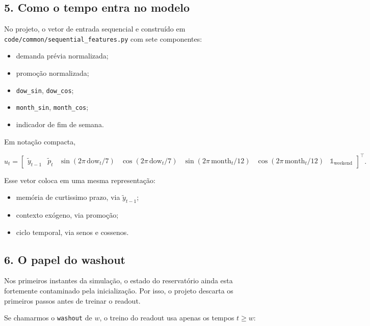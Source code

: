 \documentclass[12pt]{article}
\providecommand{\tightlist}{%
          \setlength{\itemsep}{0pt}\setlength{\parskip}{0pt}}
\begin{document}
\subsection{5. Como o tempo entra no modelo}\label{5-como-o-tempo-entra-no-modelo}

No projeto, o vetor de entrada sequencial e construído em \texttt{code/common/sequential\_features.py} com sete componentes:

\begin{itemize}
\tightlist
\item
  demanda prévia normalizada;
\item
  promoção normalizada;
\item
  \texttt{dow\_sin}, \texttt{dow\_cos};
\item
  \texttt{month\_sin}, \texttt{month\_cos};
\item
  indicador de fim de semana.
\end{itemize}

Em notação compacta,

\[
u_t =
\begin{bmatrix}
\widetilde{y}_{t-1} &
\widetilde{p}_t &
\sin(2\pi \, \mathrm{dow}_t / 7) &
\cos(2\pi \, \mathrm{dow}_t / 7) &
\sin(2\pi \, \mathrm{month}_t / 12) &
\cos(2\pi \, \mathrm{month}_t / 12) &
\mathbb{1}_{\mathrm{weekend}}
\end{bmatrix}^\top.
\]

Esse vetor coloca em uma mesma representação:

\begin{itemize}
\tightlist
\item
  memória de curtissimo prazo, via \(\widetilde{y}_{t-1}\);
\item
  contexto exógeno, via promoção;
\item
  ciclo temporal, via senos e cossenos.
\end{itemize}

\subsection{6. O papel do washout}\label{6-o-papel-do-washout}

Nos primeiros instantes da simulação, o estado do reservatório ainda esta fortemente contaminado pela inicialização. Por isso, o projeto descarta os primeiros passos antes de treinar o readout.

Se chamarmos o \texttt{washout} de \(w\), o treino do readout usa apenas os tempos \(t \ge w\):
\end{document}
